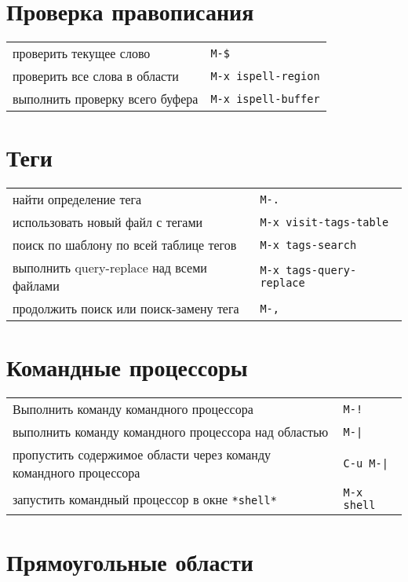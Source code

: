 \documentclass[10pt]{article}
\newlength{\ColWidth}
\newcommand{\kbd}[1]{\texttt{#1}}
\begin{document}
\section{Проверка правописания}

\begin{tabular}{p{\ColWidth}l}
проверить текущее слово & \kbd{M-\$} \\
проверить все слова в области & \kbd{M-x ispell-region} \\
выполнить проверку всего буфера & \kbd{M-x ispell-buffer} \\
\end{tabular}

\section{Теги}

\begin{tabular}{p{\ColWidth}l}
найти определение тега & \kbd{M-.} \\
использовать новый файл с тегами & \kbd{M-x visit-tags-table} \\

поиск по шаблону по всей таблице тегов & \kbd{M-x tags-search} \\
выполнить query-replace над всеми файлами & \kbd{M-x tags-query-replace} \\
продолжить поиск или поиск-замену тега & \kbd{M-,} \\
\end{tabular}

\section{Командные процессоры}

\begin{tabular}{p{\ColWidth}l}
Выполнить команду командного процессора & \kbd{M-!} \\
выполнить команду командного процессора над областью & \kbd{M-|} \\
пропустить содержимое области через команду командного процессора & \kbd{C-u M-|} \\
запустить командный процессор в окне \kbd{*shell*} & \kbd{M-x shell} \\
\end{tabular}

\section{Прямоугольные области}
\end{document}
